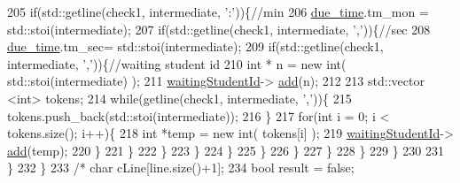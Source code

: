 \begin{DoxyCode}
205                                         \textcolor{keywordflow}{if}(std::getline(check1, intermediate, \textcolor{charliteral}{':'}))\{\textcolor{comment}{//min}
206                                             \hyperlink{classbook_abf72d9a32cdadee632df5a626dbe33b8}{due\_time}.tm\_mon =  std::stoi(intermediate);
207                                             \textcolor{keywordflow}{if}(std::getline(check1, intermediate, \textcolor{charliteral}{','}))\{\textcolor{comment}{//sec}
208                                                 \hyperlink{classbook_abf72d9a32cdadee632df5a626dbe33b8}{due\_time}.tm\_sec=  std::stoi(intermediate);
209                                                 \textcolor{keywordflow}{if}(std::getline(check1, intermediate, \textcolor{charliteral}{','}))\{\textcolor{comment}{//waiting
       student id}
210                                                     \textcolor{keywordtype}{int} * n = \textcolor{keyword}{new} int( std::stoi(intermediate) );
211                                                     \hyperlink{classbook_a40ce04fcfbf99ffdbe7a4e1463588ee5}{waitingStudentId}->
      \hyperlink{classqueue_l_l_adcbcc26433da2c9d17b6cf0802d1d7d2}{add}(n);
212 
213                                                     std::vector <int> tokens;
214                                                     \textcolor{keywordflow}{while}(getline(check1, intermediate, \textcolor{charliteral}{','}))\{
215                                                         tokens.push\_back(std::stoi(intermediate));
216                                                     \}
217                                                     \textcolor{keywordflow}{for}(\textcolor{keywordtype}{int} i = 0; i < tokens.size(); i++)\{
218                                                         \textcolor{keywordtype}{int} *temp = \textcolor{keyword}{new} int( tokens[i] );
219                                                         \hyperlink{classbook_a40ce04fcfbf99ffdbe7a4e1463588ee5}{waitingStudentId}->
      \hyperlink{classqueue_l_l_adcbcc26433da2c9d17b6cf0802d1d7d2}{add}(temp);
220                                                     \}
221                                                 \}
222                                             \}
223                                         \}
224                                     \}
225                                 \}
226                             \}
227                         \}
228                     \}
229                 \}
230 
231             \}
232     \}
233 \textcolor{comment}{/*  char  cLine[line.size()+1];}
234 \textcolor{comment}{    bool result = false;}

\end{DoxyCode}
